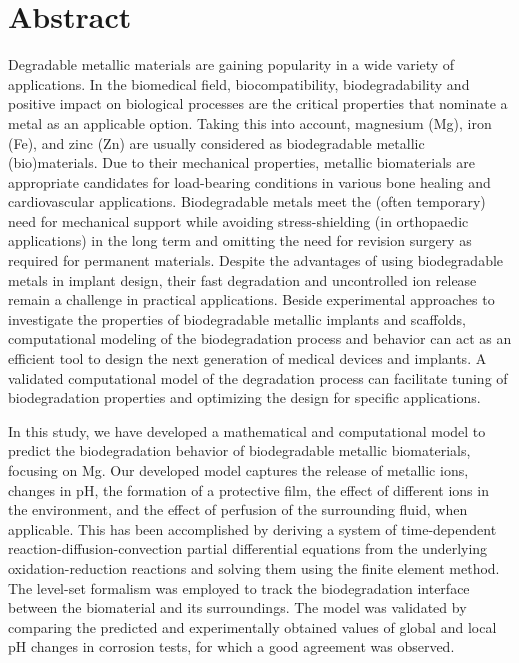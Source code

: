 \chapter*{Abstract}                                 \label{ch:abstract}

Degradable metallic materials are gaining popularity in a wide variety of applications. In the biomedical field, biocompatibility, biodegradability and positive impact on biological processes are the critical properties that nominate a metal as an applicable option. Taking this into account, magnesium (Mg), iron (Fe), and zinc (Zn) are usually considered as biodegradable metallic (bio)materials. Due to their mechanical properties, metallic biomaterials are appropriate candidates for load-bearing conditions in various bone healing and cardiovascular applications. Biodegradable metals meet the (often temporary) need for mechanical support while avoiding stress-shielding (in orthopaedic applications) in the long term and omitting the need for revision surgery as required for permanent materials.  Despite the advantages of using biodegradable metals in implant design, their fast degradation and uncontrolled ion release remain a challenge in practical applications. Beside experimental approaches to investigate the properties of biodegradable metallic implants and scaffolds, computational modeling of the biodegradation process and behavior can act as an efficient tool to design the next generation of medical devices and implants. A validated computational model of the degradation process can facilitate tuning of biodegradation properties and optimizing the design for specific applications. 

In this study, we have developed a mathematical and computational model to predict the biodegradation behavior of biodegradable metallic biomaterials, focusing on Mg. Our developed model captures the release of metallic ions, changes in pH, the formation of a protective film, the effect of different ions in the environment, and the effect of perfusion of the surrounding fluid, when applicable. This has been accomplished by deriving a system of time-dependent reaction-diffusion-convection partial differential equations from the underlying oxidation-reduction reactions and solving them using the finite element method. The level-set formalism was employed to track the biodegradation interface between the biomaterial and its surroundings. The model was validated by comparing the predicted and experimentally obtained values of global and local pH changes in corrosion tests, for which a good agreement was observed. 

